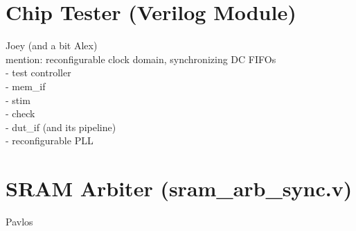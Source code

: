 \section{Chip Tester (Verilog Module)}
Joey  (and a bit Alex) \\
   mention: reconfigurable clock domain, synchronizing DC FIFOs \\
   - test controller \\
     - mem\_if \\
     - stim \\
     - check \\
   - dut\_if (and its pipeline) \\
   - reconfigurable PLL \\


\section{SRAM Arbiter (sram\_arb\_sync.v)}
Pavlos